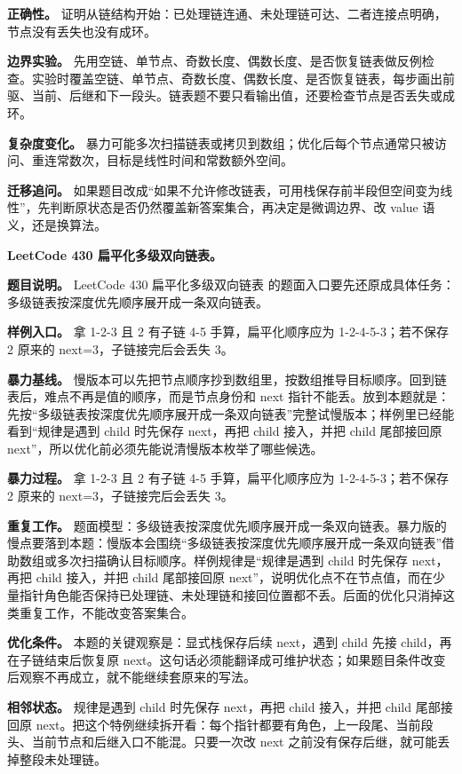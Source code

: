 \textbf{正确性。} 证明从链结构开始：已处理链连通、未处理链可达、二者连接点明确，节点没有丢失也没有成环。

\textbf{边界实验。} 先用空链、单节点、奇数长度、偶数长度、是否恢复链表做反例检查。实验时覆盖空链、单节点、奇数长度、偶数长度、是否恢复链表，每步画出前驱、当前、后继和下一段头。链表题不要只看输出值，还要检查节点是否丢失或成环。

\textbf{复杂度变化。} 暴力可能多次扫描链表或拷贝到数组；优化后每个节点通常只被访问、重连常数次，目标是线性时间和常数额外空间。

\textbf{迁移追问。} 如果题目改成“如果不允许修改链表，可用栈保存前半段但空间变为线性”，先判断原状态是否仍然覆盖新答案集合，再决定是微调边界、改 value 语义，还是换算法。

\noindent\textbf{LeetCode 430 扁平化多级双向链表。}

\textbf{题目说明。} LeetCode 430 扁平化多级双向链表 的题面入口要先还原成具体任务：多级链表按深度优先顺序展开成一条双向链表。

\textbf{样例入口。} 拿 1-2-3 且 2 有子链 4-5 手算，扁平化顺序应为 1-2-4-5-3；若不保存 2 原来的 next=3，子链接完后会丢失 3。

\textbf{暴力基线。} 慢版本可以先把节点顺序抄到数组里，按数组推导目标顺序。回到链表后，难点不再是值的顺序，而是节点身份和 next 指针不能丢。放到本题就是：先按“多级链表按深度优先顺序展开成一条双向链表”完整试慢版本；样例里已经能看到“规律是遇到 child 时先保存 next，再把 child 接入，并把 child 尾部接回原 next”，所以优化前必须先能说清慢版本枚举了哪些候选。

\textbf{暴力过程。} 拿 1-2-3 且 2 有子链 4-5 手算，扁平化顺序应为 1-2-4-5-3；若不保存 2 原来的 next=3，子链接完后会丢失 3。

\textbf{重复工作。} 题面模型：多级链表按深度优先顺序展开成一条双向链表。暴力版的慢点要落到本题：慢版本会围绕“多级链表按深度优先顺序展开成一条双向链表”借助数组或多次扫描确认目标顺序。样例规律是“规律是遇到 child 时先保存 next，再把 child 接入，并把 child 尾部接回原 next”，说明优化点不在节点值，而在少量指针角色能否保持已处理链、未处理链和接回位置都不丢。后面的优化只消掉这类重复工作，不能改变答案集合。

\textbf{优化条件。} 本题的关键观察是：显式栈保存后续 next，遇到 child 先接 child，再在子链结束后恢复原 next。这句话必须能翻译成可维护状态；如果题目条件改变后观察不再成立，就不能继续套原来的写法。

\textbf{相邻状态。} 规律是遇到 child 时先保存 next，再把 child 接入，并把 child 尾部接回原 next。把这个特例继续拆开看：每个指针都要有角色，上一段尾、当前段头、当前节点和后继入口不能混。只要一次改 next 之前没有保存后继，就可能丢掉整段未处理链。


